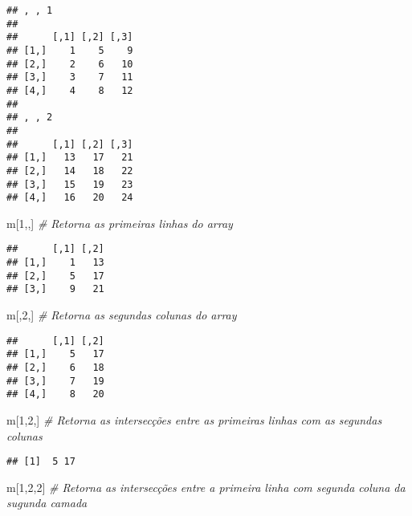 \documentclass[
]{book}
\newenvironment{Shaded}{\begin{snugshade}}{\end{snugshade}}
\newcommand{\CommentTok}[1]{\textcolor[rgb]{0.56,0.35,0.01}{\textit{#1}}}
\newcommand{\DecValTok}[1]{\textcolor[rgb]{0.00,0.00,0.81}{#1}}
\newcommand{\NormalTok}[1]{#1}
\begin{document}
\begin{verbatim}
## , , 1
## 
##      [,1] [,2] [,3]
## [1,]    1    5    9
## [2,]    2    6   10
## [3,]    3    7   11
## [4,]    4    8   12
## 
## , , 2
## 
##      [,1] [,2] [,3]
## [1,]   13   17   21
## [2,]   14   18   22
## [3,]   15   19   23
## [4,]   16   20   24
\end{verbatim}

\begin{Shaded}
\begin{Highlighting}[]
\NormalTok{m[}\DecValTok{1}\NormalTok{,,] }\CommentTok{\# Retorna as primeiras linhas do array}
\end{Highlighting}
\end{Shaded}

\begin{verbatim}
##      [,1] [,2]
## [1,]    1   13
## [2,]    5   17
## [3,]    9   21
\end{verbatim}

\begin{Shaded}
\begin{Highlighting}[]
\NormalTok{m[,}\DecValTok{2}\NormalTok{,] }\CommentTok{\# Retorna as segundas colunas do array}
\end{Highlighting}
\end{Shaded}

\begin{verbatim}
##      [,1] [,2]
## [1,]    5   17
## [2,]    6   18
## [3,]    7   19
## [4,]    8   20
\end{verbatim}

\begin{Shaded}
\begin{Highlighting}[]
\NormalTok{m[}\DecValTok{1}\NormalTok{,}\DecValTok{2}\NormalTok{,] }\CommentTok{\# Retorna as intersecções entre as primeiras linhas com as segundas colunas}
\end{Highlighting}
\end{Shaded}

\begin{verbatim}
## [1]  5 17
\end{verbatim}

\begin{Shaded}
\begin{Highlighting}[]
\NormalTok{m[}\DecValTok{1}\NormalTok{,}\DecValTok{2}\NormalTok{,}\DecValTok{2}\NormalTok{] }\CommentTok{\# Retorna as intersecções entre a primeira linha com segunda coluna da sugunda camada}
\end{Highlighting}
\end{Shaded}
\end{document}
